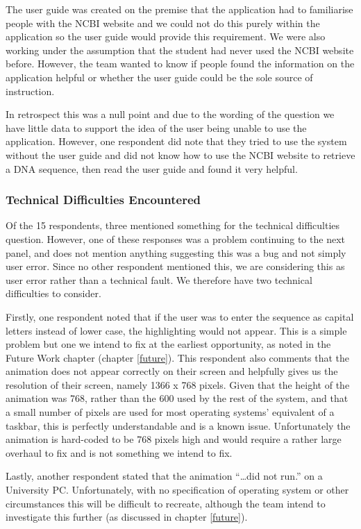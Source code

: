 The user guide was created on the premise that the application had to
familiarise people with the NCBI website \cite{ncbi} and we could not
do this purely within the application so the user guide would provide
this requirement.
We were also working under the assumption that the student had never
used the NCBI website \cite{ncbi} before.
However, the team wanted to know if people found the information on the
application helpful or whether the user guide could be the sole source
of instruction.

In retrospect this was a null point and due to the wording of the
question we have little data to support the idea of the user being
unable to use the application.
However, one respondent did note that they tried to use the system
without the user guide and did not know how to use the NCBI website
\cite{ncbi} to retrieve a DNA sequence, then read the user guide and
found it very helpful. 

\subsubsection{Technical Difficulties Encountered}

Of the 15 respondents, three mentioned something for the technical
difficulties question.
However, one of these responses was a problem continuing to the next
panel, and does not mention anything suggesting this was a bug and not
simply user error.
Since no other respondent mentioned this, we are considering this as
user error rather than a technical fault.
We therefore have two technical difficulties to consider.

Firstly, one respondent noted that if the user was to enter the
sequence as capital letters instead of lower case, the highlighting
would not appear.
This is a simple problem but one we intend to fix at the earliest
opportunity, as noted in the Future Work chapter (chapter
\ref{future}).
This respondent also comments that the animation does not appear
correctly on their screen and helpfully gives us the resolution of
their screen, namely 1366 x 768 pixels.
Given that the height of the animation was 768, rather than the 600
used by the rest of the system, and that a small number of pixels are
used for most operating systems' equivalent of a taskbar, this is
perfectly understandable and is a known issue.
Unfortunately the animation is hard-coded to be 768 pixels high and
would require a rather large overhaul to fix and is not something we
intend to fix.

Lastly, another respondent stated that the animation ``\ldots did not
run.'' on a University PC.
Unfortunately, with no specification of operating system or other
circumstances this will be difficult to recreate, although the team
intend to investigate this further (as discussed in chapter
\ref{future}).

